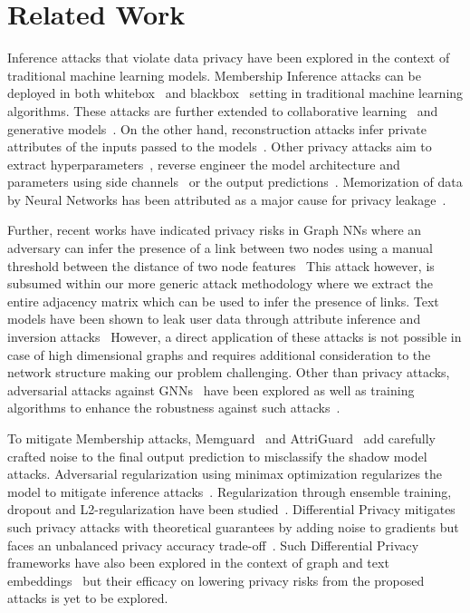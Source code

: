 \section{Related Work}\label{related}


Inference attacks that violate data privacy have been explored in the context of traditional machine learning models.
Membership Inference attacks can be deployed in both whitebox~\cite{whitebox} and blackbox~\cite{membershipinf} setting in traditional machine learning algorithms.
These attacks are further extended to collaborative learning~\cite{collabinf,whitebox} and generative models~\cite{logan}.
On the other hand, reconstruction attacks infer private attributes of the inputs passed to the models~\cite{attributeinf, attributeinf2, propertyinf, modelinversion}.
Other privacy attacks aim to extract hyperparameters~\cite{8418595}, reverse engineer the model architecture and parameters using side channels~\cite{timing} or the output predictions~\cite{stealml}.
Memorization of data by Neural Networks has been attributed as a major cause for privacy leakage~\cite{memorize,secretsharer,overlearninginf}.

Further, recent works have indicated privacy risks in Graph NNs where an adversary can infer the presence of a link between two nodes using a manual threshold between the distance of two node features~\cite{linksteal}
This attack however, is subsumed within our more generic attack methodology where we extract the entire adjacency matrix which can be used to infer the presence of links.
Text models have been shown to leak user data through attribute inference and inversion attacks~\cite{textembleak,nlp}
However, a direct application of these attacks is not possible in case of high dimensional graphs and requires additional consideration to the network structure making our problem challenging.
Other than privacy attacks, adversarial attacks against GNNs~\cite{graphatt,nodepoison} have been explored as well as training algorithms to enhance the robustness against such attacks~\cite{robustdef1,robustdef2}.

To mitigate Membership attacks, Memguard~\cite{memguard} and AttriGuard~\cite{attriguard} add carefully crafted noise to the final output prediction to misclassify the shadow model attacks.
Adversarial regularization using minimax optimization regularizes the model to mitigate inference attacks~\cite{advreg}.
Regularization through ensemble training, dropout and L2-regularization have been studied~\cite{ndss19salem}.
Differential Privacy mitigates such privacy attacks with theoretical guarantees by adding noise to gradients but faces an unbalanced privacy accuracy trade-off~\cite{diffpriv}.
Such Differential Privacy frameworks have also been explored in the context of graph and text embeddings~\cite{dptext,dpne} but their efficacy on lowering privacy risks from the proposed attacks is yet to be explored.
